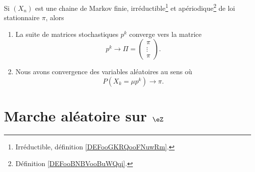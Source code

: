 \begin{theorem}     \label{ThoQSuLZoz}
	Si \( (X_n)\) est une chaine de Markov finie, irréductible\footnote{Irréductible, définition \ref{DEFooGKRQooFNuwRm}.} et apériodique\footnote{Définition \ref{DEFooBNBVooBuWQqi}.} de loi stationnaire \( \pi\), alors
	\begin{enumerate}
		\item
		      La suite de matrices stochastiques \( p^k\) converge vers la matrice
		      \begin{equation}
			      p^k\to\Pi=\begin{pmatrix}
				      \pi    \\
				      \vdots \\
				      \pi
			      \end{pmatrix}.
		      \end{equation}
		\item
		      Nous avons convergence des variables aléatoires au sens où
		      \begin{equation}
			      P(X_k=\mu p^k)\to \pi.
		      \end{equation}
	\end{enumerate}
\end{theorem}

\section{Marche aléatoire sur \texorpdfstring{\( \eZ\)}{Z}}

